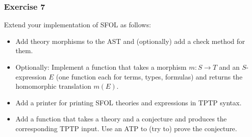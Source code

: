 \begin{frame}\frametitle{Exercise 7}
Extend your implementation of SFOL as follows:
\begin{itemize}
\item Add theory morphisms to the AST and (optionally) add a check method for them.
\item Optionally: Implement a function that takes a morphism $m:S\to T$ and an $S$-expression $E$ (one function each for terms, types, formulas) and returns the homomorphic translation $m(E)$.
\item Add a printer for printing SFOL theories and expressions in TPTP syntax.
\item Add a function that takes a theory and a conjecture and produces the corresponding TPTP input. Use an ATP to (try to) prove the conjecture.
\end{itemize}
\end{frame}

